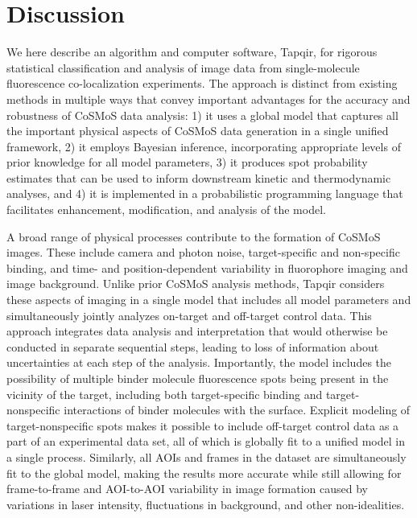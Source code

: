 \section*{Discussion}

We here describe an algorithm and computer software, Tapqir, for rigorous statistical classification and analysis of image data from single-molecule fluorescence co-localization experiments. The approach is distinct from existing methods in multiple ways that convey important advantages for the accuracy and robustness of CoSMoS data analysis: 1) it uses a global model that captures all the important physical aspects of CoSMoS data generation in a single unified framework, 2) it employs Bayesian inference, incorporating appropriate levels of prior knowledge for all model parameters, 3) it produces spot probability estimates that can be used to inform downstream kinetic and thermodynamic analyses, and 4) it is implemented in a probabilistic programming language that facilitates enhancement, modification, and analysis of the model.

A broad range of physical processes contribute to the formation of CoSMoS images. These include camera and photon noise, target-specific and non-specific binding, and time- and position-dependent variability in fluorophore imaging and image background. Unlike prior CoSMoS analysis methods, Tapqir considers these aspects of imaging in a single model that includes all model parameters and simultaneously jointly analyzes on-target and off-target control data.  This approach integrates data analysis and interpretation that would otherwise be conducted in separate sequential steps, leading to loss of information about uncertainties at each step of the analysis. Importantly, the model includes the possibility of multiple binder molecule fluorescence spots being present in the vicinity of the target, including both target-specific binding and target-nonspecific interactions of binder molecules with the surface. Explicit modeling of target-nonspecific spots makes it possible to include off-target control data as a part of an experimental data set, all of which is globally fit to a unified model in a single process.  Similarly, all AOIs and frames in the dataset are simultaneously fit to the global model, making the results more accurate while still allowing for frame-to-frame and AOI-to-AOI variability in image formation caused by variations in laser intensity, fluctuations in background, and other non-idealities.


